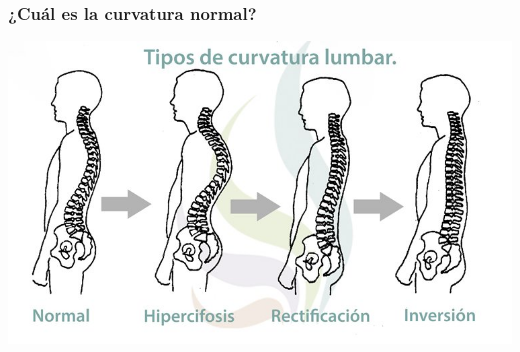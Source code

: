 \documentclass[hyperref={pdfpagelabels=false},xcolor=pst,pdf,fragile]{beamer}
\begin{document}
\begin{frame}
  \frametitle{
	  {¿Cuál es la curvatura normal?}
  }

  \begin{center}
	  \includegraphics[scale=0.4]{img/tipos_de_curvatura.jpg}
  \end{center}

\end{frame}
\end{document}
